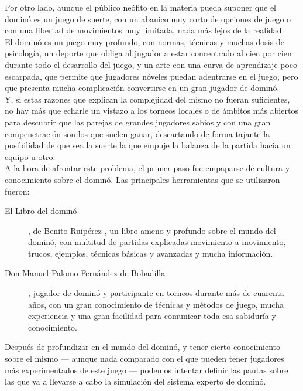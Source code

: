 Por otro lado, aunque el público neófito en la materia pueda suponer que el dominó es un juego de suerte, con un
abanico muy corto de opciones de juego o con una libertad de movimientos muy limitada, nada más lejos de la realidad. \\

El dominó es un juego muy profundo, con normas, técnicas y muchas dosis de psicología, un deporte que obliga al
jugador a estar concentrado al cien por cien durante todo el desarrollo del juego, y un arte con una curva de
aprendizaje poco escarpada, que permite que jugadores nóveles puedan adentrarse en el juego, pero que presenta
mucha complicación convertirse en un gran jugador de dominó. \\

Y, si estas razones que explican la complejidad del mismo no fueran suficientes, no hay más que echarle un vistazo
a los torneos locales o de ámbitos más abiertos para descubrir que las parejas de grandes jugadores sabios y con
una gran compenetración son los que suelen ganar, descartando de forma tajante la posibilidad de que sea la suerte
la que empuje la balanza de la partida hacia un equipo u otro. \\

A la hora de afrontar este problema, el primer paso fue empaparse de cultura y conocimiento sobre el dominó. Las
principales herramientas que se utilizaron fueron:

\begin{description}
    \item[El Libro del dominó], de Benito Ruipérez \cite{mora90}, un libro ameno y profundo sobre el mundo del dominó,
        con multitud de partidas explicadas movimiento a movimiento, trucos, ejemplos, técnicas básicas y avanzadas y
        mucha información.
    \item[Don Manuel Palomo Fernández de Bobadilla], jugador de dominó y participante en torneos durante más de cuarenta
        años, con un gran conocimiento de técnicas y métodos de juego, mucha experiencia y una gran facilidad para
        comunicar toda esa sabiduría y conocimiento.
\end{description}

Después de profundizar en el mundo del dominó, y tener cierto conocimiento sobre el mismo --- aunque nada comparado
con el que pueden tener jugadores más experimentados de este juego --- podemos intentar definir las pautas sobre
las que va a llevarse a cabo la simulación del sistema experto de dominó.
